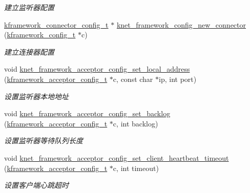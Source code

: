 \begin{DoxyCompactItemize}
\begin{DoxyCompactList}\small\item\em 建立监听器配置 \end{DoxyCompactList}\item 
\hyperlink{a00051_a44d3033eba5a4fd784a741700a7a2521_a44d3033eba5a4fd784a741700a7a2521}{kframework\+\_\+connector\+\_\+config\+\_\+t} $\ast$ \hyperlink{a00104_ga135342b1a0a31db4d614ee96a76d3e46_ga135342b1a0a31db4d614ee96a76d3e46}{knet\+\_\+framework\+\_\+config\+\_\+new\+\_\+connector} (\hyperlink{a00051_adeaf952e0f0887507ff836385bf54874_adeaf952e0f0887507ff836385bf54874}{kframework\+\_\+config\+\_\+t} $\ast$c)
\begin{DoxyCompactList}\small\item\em 建立连接器配置 \end{DoxyCompactList}\item 
void \hyperlink{a00104_gae13e628b69405ef9a338980da9475b53_gae13e628b69405ef9a338980da9475b53}{knet\+\_\+framework\+\_\+acceptor\+\_\+config\+\_\+set\+\_\+local\+\_\+address} (\hyperlink{a00051_a39c993eb450173e4fde04498d757f9b6_a39c993eb450173e4fde04498d757f9b6}{kframework\+\_\+acceptor\+\_\+config\+\_\+t} $\ast$c, const char $\ast$ip, int port)
\begin{DoxyCompactList}\small\item\em 设置监听器本地地址 \end{DoxyCompactList}\item 
void \hyperlink{a00104_gab236e9cd130017f98625904439052b30_gab236e9cd130017f98625904439052b30}{knet\+\_\+framework\+\_\+acceptor\+\_\+config\+\_\+set\+\_\+backlog} (\hyperlink{a00051_a39c993eb450173e4fde04498d757f9b6_a39c993eb450173e4fde04498d757f9b6}{kframework\+\_\+acceptor\+\_\+config\+\_\+t} $\ast$c, int backlog)
\begin{DoxyCompactList}\small\item\em 设置监听器等待队列长度 \end{DoxyCompactList}\item 
void \hyperlink{a00104_ga0f1a47656155b56aa812b07d44a8aa81_ga0f1a47656155b56aa812b07d44a8aa81}{knet\+\_\+framework\+\_\+acceptor\+\_\+config\+\_\+set\+\_\+client\+\_\+heartbeat\+\_\+timeout} (\hyperlink{a00051_a39c993eb450173e4fde04498d757f9b6_a39c993eb450173e4fde04498d757f9b6}{kframework\+\_\+acceptor\+\_\+config\+\_\+t} $\ast$c, int timeout)
\begin{DoxyCompactList}\small\item\em 设置客户端心跳超时 \end{DoxyCompactList}\item 

\end{DoxyCompactItemize}
